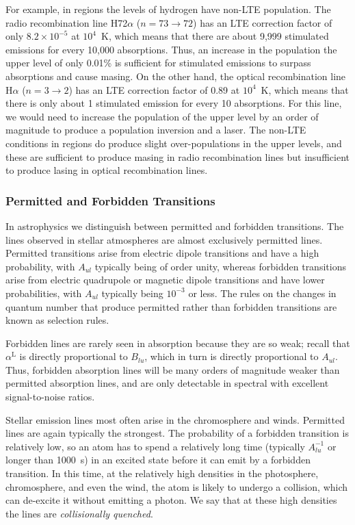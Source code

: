 For example, in
 regions the levels of hydrogen have non-LTE
population. The radio recombination line H72$\alpha$
($n=73\rightarrow72$) has an LTE correction factor of only $8.2\times10^{-5}$ at $10^4$~K, which means that there are about 9,999 stimulated emissions for every 10,000 absorptions. Thus, an increase in the population the upper level of only 0.01\% is sufficient for stimulated emissions to surpass absorptions and cause masing. On the other hand, the optical recombination line H$\alpha$ ($n=3\rightarrow2$) has an LTE correction factor of 0.89 at $10^4$~K, which means that there is only about 1 stimulated emission for every 10 absorptions. For this line, we would need to increase the population of the upper level by an order of magnitude to produce a population inversion and a laser. The non-LTE conditions in  regions do produce slight over-populations in the upper levels, and these are sufficient to produce masing in radio recombination lines but insufficient to produce lasing in optical recombination lines.

\subsubsection{Permitted and Forbidden Transitions}

In astrophysics we distinguish between permitted and
forbidden transitions. The lines observed in stellar
atmospheres are almost exclusively permitted lines.
Permitted transitions arise from electric dipole transitions
and have a high probability, with $A_{ul}$ typically being of order unity, whereas forbidden transitions arise from electric
quadrupole or magnetic dipole transitions and have lower
probabilities, with $A_{ul}$ typically being $10^{-3}$ or less. 
The rules on the changes in quantum
number that produce permitted rather than forbidden
transitions are known as selection rules.

Forbidden lines are rarely seen in absorption because they are so weak;
recall that $\alpha^\mathrm{L}$ is directly proportional to $B_{lu}$,
which in turn is directly proportional to $A_{ul}$. Thus, forbidden
absorption lines will be many orders of magnitude weaker than permitted
absorption lines, and are only detectable in spectral with excellent signal-to-noise
ratios.

Stellar emission lines most often arise in the chromosphere
and winds.  Permitted lines
are again typically the strongest. The probability of a forbidden transition is
relatively low, so an atom has to spend a relatively long
time (typically $A_{lu}^{-1}$ or longer than 1000~s) in an excited state
before it can emit by a forbidden transition. In this time,
at the relatively high densities in the photosphere,
chromosphere, and even the wind, the atom is likely to
undergo a collision, which can de-excite it without emitting
a photon. We say that at these high densities the lines are
\emph{collisionally quenched}.

